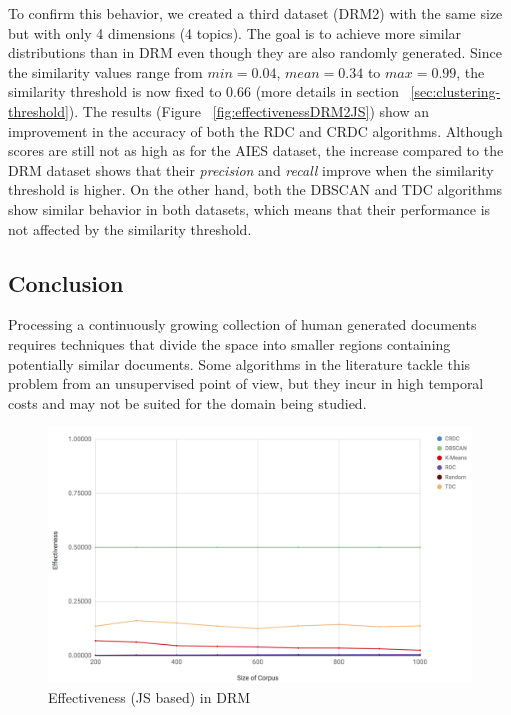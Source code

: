 To confirm this behavior, we created a third dataset (DRM2) with the same size but with only 4 dimensions (4 topics). The goal is to achieve more similar distributions than in DRM even though they are also randomly generated. Since the similarity values range from $min=0.04$, $mean=0.34$ to $max=0.99$, the similarity threshold is now fixed to 0.66 (more details in section ~\ref{sec:clustering-threshold}). The results (Figure ~\ref{fig:effectivenessDRM2JS}) show an improvement in the accuracy of both the RDC and CRDC algorithms. Although scores are still not as high as for the AIES dataset, the increase compared to the DRM dataset shows that their \textit{precision} and \textit{recall} improve when the similarity threshold is higher. On the other hand, both the DBSCAN and TDC algorithms show similar behavior in both datasets, which means that their performance is not affected by the similarity threshold.

\subsection{Conclusion}
\label{sec:clustering-conclusion}

Processing a continuously growing collection of human generated documents requires techniques that divide the space into smaller regions containing potentially similar documents. Some algorithms in the literature tackle this problem from an unsupervised point of view, but they incur in high temporal costs and may not be suited for the domain being studied.

\begin{figure}[!htb]\centering
  \center
  \includegraphics[scale=0.45]{effectivenessDRMJS.png}
  \caption{Effectiveness (JS based) in DRM}
  \label{fig:effectivenessDRMJS}
\end{figure}

